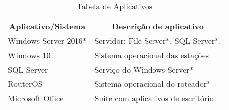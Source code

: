 \begin{table}[h!]
	\centering
\caption{Tabela de Aplicativos}
\label{tab3}
	\renewcommand{\arraystretch}{2.0}
	\begin{tabular}{|l|l|}
		\hline
		\multicolumn{1}{|c|}{\textbf{Aplicativo/Sistema}} &	 \multicolumn{1}{|c|}{\textbf{Descrição  de aplicativo}}                                 		  \\ \hline
		Windows Server 2016*                               
		& Servidor: File Server*, SQL Server*.                                               \\ \hline
		Windows 10                             
		& Sistema operacional das estações           					\\ \hline
		SQL Server                                  
		& Serviço do Windows Server*         \\ \hline
		RouterOS
		& Sistema operacional do roteador*        \\ \hline
		Microsoft Office                                  
		& Suite com aplicativos de escritório   \\ \hline
	\end{tabular}
\end{table}
